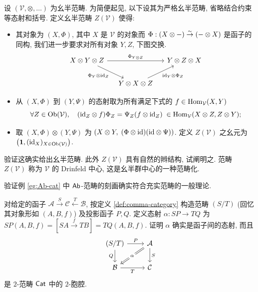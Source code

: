\begin{Exercises}
	\item 设 $(\mathcal{V}, \otimes, \ldots)$ 为幺半范畴. 为简便起见, 以下设其为严格幺半范畴, 省略结合约束等态射和括号. 定义幺半范畴 $Z(\mathcal{V})$ 使得:
		\begin{itemize}
			\item 其对象为 $(X, \Phi)$, 其中 $X$ 是 $\mathcal{V}$ 的对象而 $\Phi: (X \otimes -) \stackrel{\sim}{\rightarrow} (- \otimes X)$ 是函子的同构, 我们进一步要求对所有对象 $Y,Z$, 下图交换.
				\[\begin{tikzcd}[column sep=small]
					X \otimes Y \otimes Z \arrow[rr, "\Phi_{Y \otimes Z}"] \arrow[rd, "{\Phi_Y \otimes \identity_Z}"'] & & Y \otimes Z \otimes X \\
					&  Y \otimes X \otimes Z \arrow[ru, "{\identity_Y \otimes \Phi_Z}"'] &
				\end{tikzcd}\]
			\item 从 $(X, \Phi)$ 到 $(Y, \Psi)$ 的态射取为所有满足下式的 $f \in \operatorname{Hom}_{\mathcal{V}}(X,Y)$
				\[ \forall Z \in \operatorname{Ob}(\mathcal{V}),\quad (\mathrm{id}_Z \otimes f) \Phi_Z = \Psi_Z (f \otimes \mathrm{id}_Z) \; \in \operatorname{Hom}_{\mathcal{V}}(X \otimes Z, Z \otimes Y); \]
			\item 取 $(X, \Phi) \otimes (Y, \Psi)$ 为 $(X \otimes Y,\; (\Phi \otimes \mathrm{id})(\mathrm{id} \otimes \Psi))$. 定义 $Z(\mathcal{V})$ 之幺元为 $\left(\mathbf{1}, (\mathrm{id}_X)_{X \in \operatorname{Ob}(\mathcal{V})}\right)$.
		\end{itemize}
		验证这确实给出幺半范畴. 此外 $Z(\mathcal{V})$ 具有自然的辫结构, 试阐明之. 范畴 $Z(\mathcal{V})$ 称为 $\mathcal{V}$ 的 Drinfeld 中心, 这是幺半群中心的一种范畴化.
	\item 验证例 \ref{eg:Ab-cat} 中 $\mathsf{Ab}$-范畴的刻画确实符合充实范畴的一般理论.
	\item 对给定的函子 $\mathcal{A} \xrightarrow{S} \mathcal{C} \xleftarrow{T} \mathcal{B}$, 按定义 \ref{def:comma-category} 构造范畴 $(S/T)$ (回忆其对象形如 $(A,B,f)$) 及投影函子 $P,Q$. 定义态射 $\alpha: SP \to TQ$ 为 $SP(A,B,f) = \left[ SA \xrightarrow{f} TB \right] = TQ(A,B,f)$. 证明 $\alpha$ 确实是函子间的态射, 而且
		\[\begin{tikzcd}
			(S/T) \arrow[r, "P"] \arrow[d, "Q"'] & \mathcal{A} \arrow[d, "S"] \arrow[Rightarrow, ld, "\alpha" description] \\
			\mathcal{B} \arrow[r, "T"'] & \mathcal{C}
		\end{tikzcd}\]
		是 $2$-范畴 $\mathsf{Cat}$ 中的 $2$-胞腔.
\end{Exercises}
